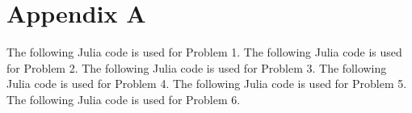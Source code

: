 \documentclass{article}
\begin{document}
\section{Appendix A}
The following Julia code is used for Problem 1.
The following Julia code is used for Problem 2.
The following Julia code is used for Problem 3.
The following Julia code is used for Problem 4.
The following Julia code is used for Problem 5.
The following Julia code is used for Problem 6.
\end{document}
